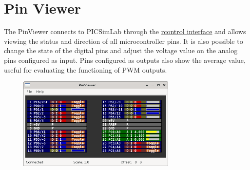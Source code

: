 \section{Pin Viewer} \hypertarget{def:pinv}{}

 The  PinViewer connects to PICSimLab through the \hyperlink{def:rcontrol}{rcontrol interface} 
 and allows viewing the status and direction of all microcontroller pins. 
 It is also possible to change the state of the digital pins and adjust the
 voltage value on the analog pins configured as input. Pins configured as outputs 
 also show the average value, useful for evaluating the functioning of PWM outputs. 
 
\begin{figure}[H]
\center
\includegraphics[width=0.7\textwidth]{img/pinviewer.png} 
\end{figure} 
